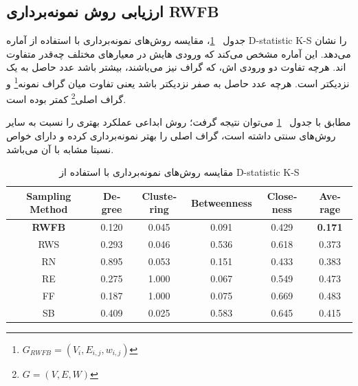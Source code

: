\subsection{ارزیابی روش نمونه‌برداری RWFB}
جدول ~\ref{eval}، مقایسه روش‌های نمونه‌برداری با استفاده از آماره D-statistic K-S را نشان می‌دهد.
این آماره مشخص می‌کند که ورودی هایش در معیارهای مختلف چه‌قدر متفاوت اند. هرچه تفاوت دو ورودی اش، که گراف نیز می‌باشند، بیشتر باشد عدد حاصل به یک نزدیکتر است.
هرچه عدد حاصل به صفر نزدیکتر باشد یعنی تفاوت میان گراف نمونه\footnote{$G_{RWFB} = (V_i, E_{i,j}, w_{i,j})$} و گراف اصلی\footnote{$G = (V, E, W)$} کمتر بوده است.

مطابق با جدول ~\ref{eval} می‌توان نتیجه گرفت؛ روش ابداعی عملکرد بهتری را نسبت به سایر روش‌های سنتی داشته است، گراف اصلی را بهتر نمونه‌برداری کرده و دارای خواص نسبتا مشابه با آن می‌باشد.
\begin{table}[t]
\centering
\begin{LTR}
\begin{latin}
\begin{tabular}{cccccc}
\hline
\textbf{Sampling Method} & \textbf{Degree} & \textbf{Clustering} & \textbf{Betweenness} & \textbf{Closeness} & \textbf{Average} \\
\hline
\textbf{RWFB} & 0.120 & 0.045 & 0.091 & 0.429 & \textbf{0.171} \\
RWS & 0.293 & 0.046 & 0.536 & 0.618 & 0.373 \\
RN & 0.895 & 0.053 & 0.151 & 0.433 & 0.383 \\
RE & 0.275 & 1.000 & 0.067 & 0.549 & 0.473 \\
FF & 0.187 & 1.000 & 0.075 & 0.669 & 0.483 \\
SB & 0.409 & 0.025 & 0.583 & 0.645 & 0.415 \\
\hline
\end{tabular}
\end{latin}
\end{LTR}
\caption{مقایسه روش‌های نمونه‌برداری با استفاده از  D-statistic K-S}
\label{eval}
\end{table}


